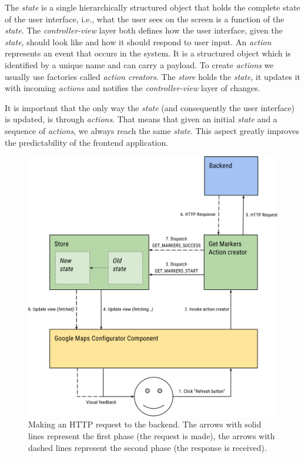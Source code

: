 The \emph{state} is a single hierarchically structured object that holds the complete state of the user interface, i.e., what the user sees on the screen is a function of the \emph{state}. The \emph{controller-view} layer both defines how the user interface, given the \emph{state}, should look like and how it should respond to user input. An \emph{action} represents an event that occurs in the system. It is a structured object which is identified by a unique name and can carry a payload. To create \emph{actions} we usually use factories called \emph{action creators}. The \emph{store} holds the \emph{state}, it updates it with incoming \emph{actions} and notifies the \emph{controller-view} layer of changes.

It is important that the only way the \emph{state} (and consequently the user interface) is updated, is through \emph{actions}. That means that given an initial \emph{state} and a sequence of \emph{actions}, we always reach the same \emph{state}. This aspect greatly improves the predictability of the frontend application. 
\begin{figure}
	\centering
	\includegraphics[width=140mm]{img/04_frontend_making_http_request.png}
	\caption{Making an HTTP request to the backend. The arrows with solid lines represent the first phase (the request is made), the arrows with dashed lines represent the second phase (the response is received).} 
	\label{fig:frontend-making-http-request}
\end{figure}


